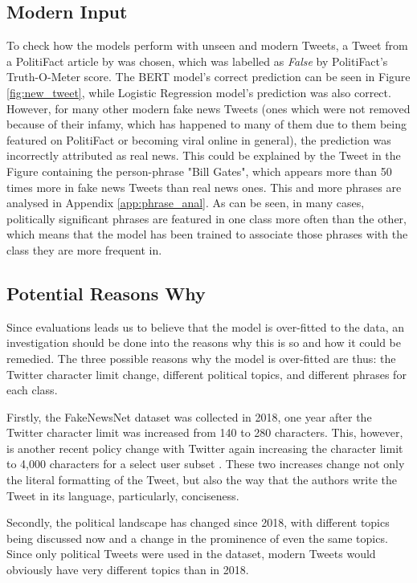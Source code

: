 \documentclass{l4proj}
\begin{document}
\subsection{Modern Input}
\label{subsec:modern_input}

To check how the models perform with unseen and modern Tweets, a Tweet from a PolitiFact article by \citet{PFBillGates} was chosen, which was labelled as \textit{False} by PolitiFact's Truth-O-Meter score. The BERT model's correct prediction can be seen in Figure \ref{fig:new_tweet}, while Logistic Regression model's prediction was also correct. However, for many other modern fake news Tweets (ones which were not removed because of their infamy, which has happened to many of them due to them being featured on PolitiFact or becoming viral online in general), the prediction was incorrectly attributed as real news. This could be explained by the Tweet in the Figure containing the person-phrase "Bill Gates", which appears more than 50 times more in fake news Tweets than real news ones. This and more phrases are analysed in Appendix \ref{app:phrase_anal}. As can be seen, in many cases, politically significant phrases are featured in one class more often than the other, which means that the model has been trained to associate those phrases with the class they are more frequent in.

\subsection{Potential Reasons Why}

Since evaluations leads us to believe that the model is over-fitted to the data, an investigation should be done into the reasons why this is so and how it could be remedied. The three possible reasons why the model is over-fitted are thus: the Twitter character limit change, different political topics, and different phrases for each class.

Firstly, the FakeNewsNet dataset was collected in 2018, one year after the Twitter character limit was increased from 140 to 280 characters. This, however, is another recent policy change with Twitter again increasing the character limit to 4,000 characters for a select user subset \citep{TwitterCharLimit}. These two increases change not only the literal formatting of the Tweet, but also the way that the authors write the Tweet in its language, particularly, conciseness.

Secondly, the political landscape has changed since 2018, with different topics being discussed now and a change in the prominence of even the same topics. Since only political Tweets were used in the dataset, modern Tweets would obviously have very different topics than in 2018.
\end{document}
